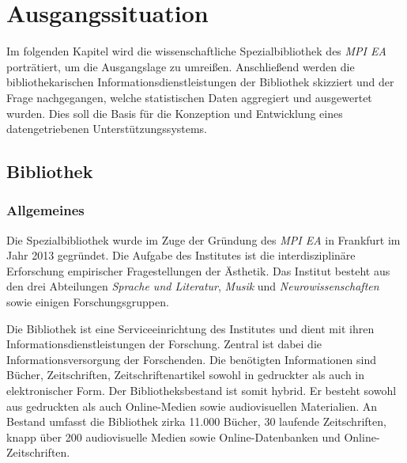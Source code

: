 \chapter{Ausgangssituation}
\label{chap:three}

Im folgenden Kapitel wird die wissenschaftliche Spezialbibliothek des \textit{\acrfull{MPI EA}}
porträtiert, um die Ausgangslage zu umreißen. Anschließend werden die bibliothekarischen Informationsdienstleistungen der Bibliothek 
skizziert und der Frage nachgegangen, welche statistischen Daten aggregiert und ausgewertet wurden.
Dies soll die Basis für die  Konzeption und Entwicklung eines datengetriebenen Unterstützungssystems.

\section{Bibliothek}
\label{chap:three_one}
\subsection{Allgemeines}
Die Spezialbibliothek wurde im Zuge der Gründung des \textit{\acrshort{MPI EA}}
in Frankfurt im Jahr 2013 gegründet. Die Aufgabe des Institutes ist die interdisziplinäre Erforschung 
empirischer Fragestellungen der Ästhetik. Das Institut besteht aus den drei Abteilungen \textit{Sprache und Literatur}, 
\textit{Musik} und \textit{Neurowissenschaften} sowie einigen Forschungsgruppen. %



Die Bibliothek ist eine Serviceeinrichtung des Institutes und dient mit ihren Informationsdienstleistungen 
der Forschung.
Zentral ist dabei die Informationsversorgung der Forschenden. Die benötigten Informationen sind Bücher, 
Zeitschriften, Zeitschriftenartikel sowohl in gedruckter als auch in elektronischer Form.
Der Bibliotheksbestand ist somit hybrid. Er besteht sowohl aus gedruckten als auch Online-Medien sowie 
audiovisuellen Materialien. An Bestand umfasst die Bibliothek zirka 11.000 Bücher, 30 laufende Zeitschriften, 
knapp über 200 audiovisuelle Medien sowie Online-Datenbanken
und Online-Zeitschriften.

